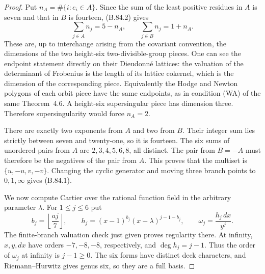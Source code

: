 \begin{proof}
Put $n_A=\#\{i:e_i\in A\}$. Since the sum of the least positive
residues in $A$ is seven and that in $B$ is fourteen, (B.84.2) gives
\[
       \sum_{j\in A}n_j=5-n_A,
       \qquad \sum_{j\in B}n_j=1+n_A.                         \tag{B.84.3}
\]
These are, up to interchange arising from the covariant convention,
the dimensions of the two height-six two-divisible-group pieces.
One can see the endpoint statement directly on their Dieudonn\'e
lattices: the valuation of the determinant of Frobenius is the
length of its lattice cokernel, which is the dimension of the
corresponding piece. Equivalently the Hodge and Newton polygons
of each orbit piece have the same endpoints, as in condition (WA)
of the same Theorem~4.6. A height-six supersingular piece has
dimension three. Therefore supersingularity would force $n_A=2$.

There are exactly two exponents from $A$ and two from $B$. Their
integer sum lies strictly between seven and twenty-one, so it is
fourteen. The six sums of unordered pairs from $A$ are
$2,3,4,5,6,8$, all distinct. The pair from $B=-A$ must therefore
be the negatives of the pair from $A$. This proves that the multiset
is $\{u,-u,v,-v\}$. Changing the cyclic generator and moving three
branch points to $0,1,\infty$ gives (B.84.1).

We now compute Cartier over the rational function field in the
arbitrary parameter $\lambda$. For $1\le j\le6$ put
\[
 b_j=\left\lfloor\frac{aj}{7}\right\rfloor,
 \qquad h_j=(x-1)^{b_j}(x-\lambda)^{j-1-b_j},
 \qquad \omega_j=\frac{h_j\,dx}{y^j}.
\]
The finite-branch valuation check just given proves regularity there.
At infinity, $x,y,dx$ have orders $-7,-8,-8$, respectively, and
$\deg h_j=j-1$. Thus the order of $\omega_j$ at infinity is
$j-1\ge0$. The six forms have distinct deck characters, and
Riemann--Hurwitz gives genus six, so they are a full basis.


\end{proof}
